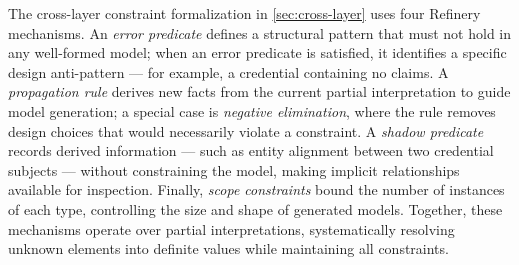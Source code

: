 The cross-layer constraint formalization in \autoref{sec:cross-layer} uses four Refinery mechanisms. An \emph{error predicate} defines a structural pattern that must not hold in any well-formed model; when an error predicate is satisfied, it identifies a specific design anti-pattern --- for example, a credential containing no claims. A \emph{propagation rule} derives new facts from the current partial interpretation to guide model generation; a special case is \emph{negative elimination}, where the rule removes design choices that would necessarily violate a constraint. A \emph{shadow predicate} records derived information --- such as entity alignment between two credential subjects --- without constraining the model, making implicit relationships available for inspection. Finally, \emph{scope constraints} bound the number of instances of each type, controlling the size and shape of generated models. Together, these mechanisms operate over partial interpretations, systematically resolving unknown elements into definite values while maintaining all constraints.
